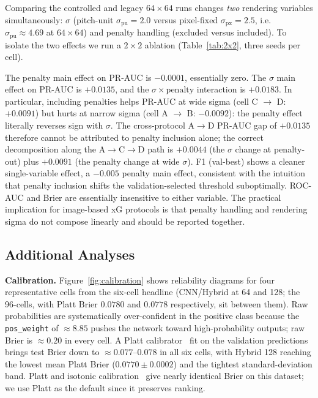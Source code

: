 \documentclass[runningheads,a4paper]{llncs}
\begin{document}
Comparing the controlled and legacy $64{\times}64$ runs changes
\emph{two} rendering variables simultaneously: $\sigma$ (pitch-unit
$\sigma_{\text{pu}}=2.0$ versus pixel-fixed $\sigma_{\text{px}}=2.5$,
i.e.\ $\sigma_{\text{pu}}\approx 4.69$ at $64{\times}64$) and penalty
handling (excluded versus included). To isolate the two effects we run
a $2{\times}2$ ablation (Table~\ref{tab:2x2}, three seeds per cell).

The penalty main effect on PR-AUC is $-0.0001$, essentially zero. The
$\sigma$ main effect on PR-AUC is $+0.0135$, and the $\sigma\times
\text{penalty}$ interaction is $+0.0183$. In particular, including
penalties helps PR-AUC at wide sigma (cell C $\rightarrow$ D:
$+0.0091$) but hurts at narrow sigma (cell A $\rightarrow$ B:
$-0.0092$): the penalty effect literally reverses sign with $\sigma$.
The cross-protocol A$\rightarrow$D PR-AUC gap of $+0.0135$ therefore
cannot be attributed to penalty inclusion alone; the correct
decomposition along the A$\rightarrow$C$\rightarrow$D path is
$+0.0044$ (the $\sigma$ change at penalty-out) plus $+0.0091$ (the
penalty change at wide $\sigma$). F1 (val-best) shows a cleaner
single-variable effect, a $-0.005$ penalty main effect, consistent
with the intuition that penalty inclusion shifts the
validation-selected threshold suboptimally. ROC-AUC and Brier are
essentially insensitive to either variable. The practical implication
for image-based xG protocols is that penalty handling and rendering
sigma do not compose linearly and should be reported together.

\subsection{Additional Analyses}
\label{sec:additional}

\textbf{Calibration.}
Figure~\ref{fig:calibration} shows reliability diagrams for four
representative cells from the six-cell headline (CNN/Hybrid at 64 and
128; the 96-cells, with Platt Brier $0.0780$ and $0.0778$ respectively,
sit between them). Raw probabilities are systematically over-confident
in the positive class because the \texttt{pos\_weight} of $\approx
8.85$ pushes the network toward high-probability outputs; raw Brier is
$\approx 0.20$ in every cell. A Platt calibrator~\cite{platt1999scaling}
fit on the validation predictions brings test Brier down to
$\approx 0.077$--$0.078$ in all six cells, with Hybrid 128 reaching the
lowest mean Platt Brier ($0.0770 \pm 0.0002$) and the tightest
standard-deviation band. Platt and isotonic
calibration~\cite{zadrozny2002transforming} give nearly identical Brier
on this dataset; we use Platt as the default since it preserves
ranking.
\end{document}
